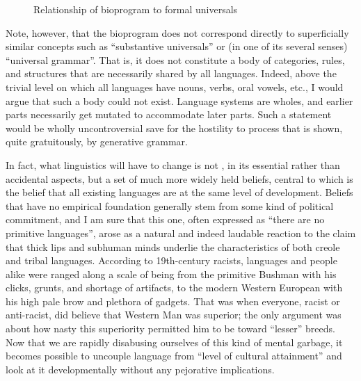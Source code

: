 \begin{figure}
	\begin{center}
	\end{center}
	\caption{Relationship of bioprogram to formal universals}\label{fig:5.1}
\end{figure}

Note, however, that the bioprogram does not correspond directly to superficially similar concepts such as ``substantive universals'' or (in one of its several senses) ``universal grammar''. That is, it does not constitute a body of categories, rules, and structures that are necessarily shared by all languages. Indeed, above the trivial level on which all languages have nouns, verbs, oral vowels, etc., I would argue that such a body could not exist. Language systems are wholes, and earlier parts necessarily get mutated to accommodate later parts. Such a statement would be wholly uncontroversial save for the hostility to process that is shown, quite gratuitously, by generative grammar.

In fact, what linguistics will have to change is not , in its essential rather than accidental aspects, but a set of much more widely held beliefs, central to which is the belief that all existing languages are at the same level of development. Beliefs that have no empirical foundation generally stem from some kind of politi\-cal commitment, and I am sure that this one, often expressed as ``there are no primitive languages'', arose as a natural and indeed laudable reaction to the claim that thick lips and subhuman minds underlie the characteristics of both creole and tribal languages. According to 19th-century racists, languages and people alike were ranged along a scale of being from the primitive Bushman with his clicks, grunts, and shortage of artifacts, to the modern Western European with his high pale brow and plethora of gadgets. That was when everyone, racist or anti-racist, did believe that Western Man was superior; the only argument was about how nasty this superiority permitted him to be toward ``lesser'' breeds. Now that we are rapidly disabusing ourselves of this kind of mental garbage, it becomes possible to uncouple language from ``level of cultural attainment'' and look at it developmentally without any pejorative implications.

